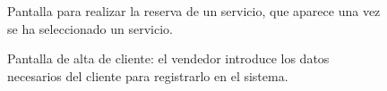 \documentclass[12pt,a4paper,titlepage]{article}
\begin{document}
\begin{figure}[hbtp]   
	\begin{center} 
		\caption{Pantalla para realizar la reserva de un servicio, que aparece una vez se ha seleccionado un servicio.} 
	\end{center}  
\end{figure}

\begin{figure}[hbtp]   
	\begin{center} 
		\caption{Pantalla de alta de cliente: el vendedor introduce los datos necesarios del cliente para registrarlo en el sistema.} 
		\label{maqAltaCliente}
	\end{center}  
\end{figure}
\newpage
\printindex
\end{document}
